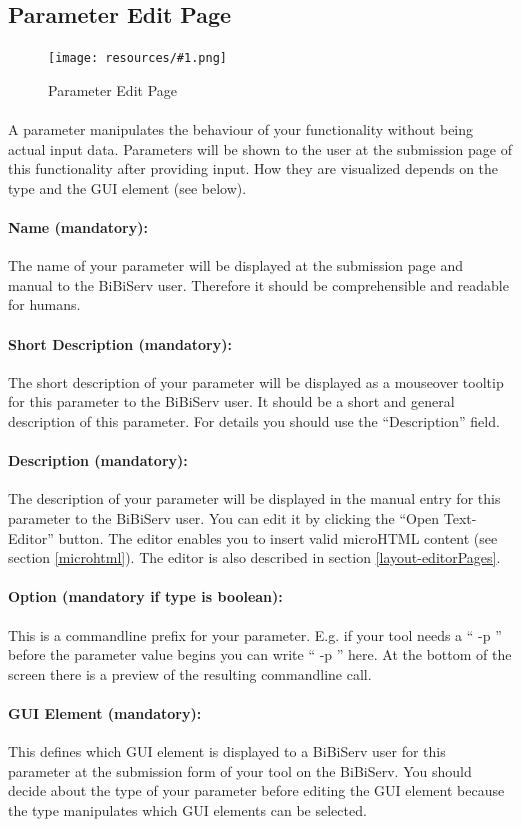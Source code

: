 \documentclass[a4paper,10pt]{book}
\newcommand{\bigpic}[1]{\texttt{[image: resources/\#1.png]}}
\newcommand{\name}[2]{\paragraph{Name #2:} The name of your #1 will be displayed at the submission page and manual to the BiBiServ user. Therefore it should be comprehensible and readable for humans.}
\newcommand{\shortDescr}[2]{\paragraph{Short Description #2:} The short description of your #1 will be displayed as a mouseover tooltip for this #1 to the BiBiServ user. It should be a short and general description of this #1. For details you should use the ``Description'' field.}
\newcommand{\descr}[2]{\paragraph{Description #2:} The description of your #1 will be displayed in the manual entry for this #1 to the BiBiServ user. You can edit it by clicking the ``Open Text-Editor'' button. The editor enables you to insert valid microHTML content (see section \ref{microhtml}). The editor is also described in section \ref{layout-editorPages}.}
\begin{document}
\subsection{Parameter Edit Page}
\label{parameter}

\begin{figure}
 \bigpic{parameter}
 \caption{Parameter Edit Page}
\end{figure}

\paragraph{}A parameter manipulates the behaviour of your functionality without being actual input data. Parameters will be shown to the user at the submission page of this functionality after providing input. How they are visualized depends on the type and the GUI element (see below).
\name{parameter}{(mandatory)}
\shortDescr{parameter}{(mandatory)}
\descr{parameter}{(mandatory)}
\paragraph{Option (mandatory if type is boolean):} This is a commandline prefix for your parameter. E.g. if your tool needs a `` -p '' before the parameter value begins you can write `` -p '' here. At the bottom of the screen there is a preview of the resulting commandline call.
\paragraph{GUI Element (mandatory):} This defines which GUI element is displayed to a BiBiServ user for this parameter at the submission form of your tool on the BiBiServ. You should decide about the type of your parameter before editing the GUI element because the type manipulates which GUI elements can be selected.
\end{document}
